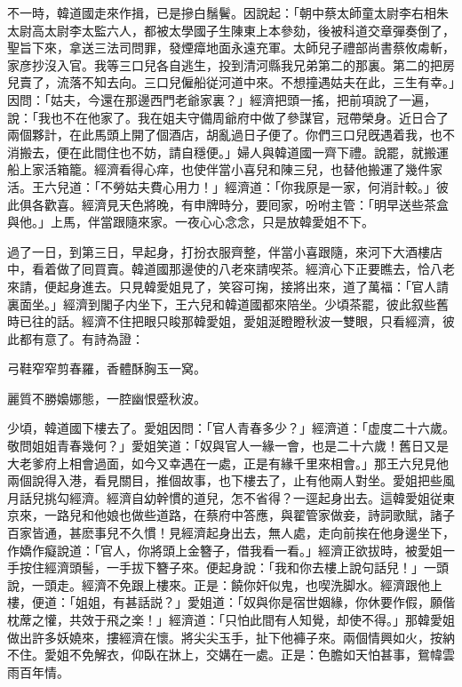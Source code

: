 不一時，韓道國走來作揖，已是摻白鬚鬢。因說起：「朝中蔡太師童太尉李右相朱太尉高太尉李太監六人，都被太學國子生陳東上本參劾，後被科道交章彈奏倒了，聖旨下來，拿送三法司問罪，發煙瘴地面永遠充軍。太師兒子禮部尚書蔡攸䖏斬，家彦抄沒入官。我等三口兒各自逃生，投到清河縣我兄弟第二的那裏。第二的把房兒賣了，流落不知去向。三口兒僱船従河道中來。不想撞遇姑夫在此，三生有幸。」因問：「姑夫，今還在那邊西門老爺家裏？」經濟把頭一搖，把前項說了一遍，說：「我也不在他家了。我在姐夫守備周爺府中做了參謀官，冠帶榮身。近日合了兩個夥計，在此馬頭上開了個酒店，胡亂過日子便了。你們三口兒旣遇着我，也不消搬去，便在此間住也不妨，請自穩便。」婦人與韓道國一齊下禮。說罷，就搬運船上家活箱籠。經濟看得心痒，也使伴當小喜兒和陳三兒，也替他搬運了幾件家活。王六兒道：「不勞姑夫費心用力！」經濟道：「你我原是一家，何消計較。」彼此俱各歡喜。經濟見天色將晚，有申牌時分，要囘家，吩咐主管：「明早送些茶盒與他。」上馬，伴當跟隨來家。一夜心心念念，只是放韓愛姐不下。

過了一日，到第三日，早起身，打扮衣服齊整，伴當小喜跟隨，來河下大酒樓店中，看着做了囘買賣。韓道國那邊使的八老來請喫茶。經濟心下正要瞧去，恰八老來請，便起身進去。只見韓愛姐見了，笑容可掬，接將出來，道了萬福：「官人請裏面坐。」經濟到閣子内坐下，王六兒和韓道國都來陪坐。少頃茶罷，彼此叙些舊時已往的話。經濟不住把眼只睃那韓愛姐，愛姐涎瞪瞪秋波一雙眼，只看經濟，彼此都有意了。有詩為證：

弓鞋窄窄剪春羅，香體酥胸玉一窝。

麗質不勝嬝娜態，一腔幽恨蹙秋波。

少頃，韓道國下樓去了。愛姐因問：「官人青春多少？」經濟道：「虚度二十六歲。敬問姐姐青春幾何？」愛姐笑道：「奴與官人一緣一會，也是二十六歲！舊日又是大老爹府上相會過面，如今又幸遇在一處，正是有緣千里來相會。」那王六兒見他兩個說得入港，看見關目，推個故事，也下樓去了，止有他兩人對坐。愛姐把些風月話兒挑勾經濟。經濟自幼幹慣的道兒，怎不省得？一逕起身出去。這韓愛姐従東京來，一路兒和他娘也做些道路，在蔡府中答應，與翟管家做妾，詩詞歌賦，諸子百家皆通，甚麽事兒不久慣！見經濟起身出去，無人處，走向前挨在他身邊坐下，作嬌作癡說道：「官人，你將頭上金簪子，借我看一看。」經濟正欲拔時，被愛姐一手按住經濟頭髻，一手拔下簪子來。便起身說：「我和你去樓上說句話兒！」一頭說，一頭走。經濟不免跟上樓來。正是：饒你奸似鬼，也喫洗脚水。經濟跟他上樓，便道：「姐姐，有甚話説？」愛姐道：「奴與你是宿世姻緣，你休要作假，願偕枕蓆之懽，共效于飛之楽！」經濟道：「只怕此間有人知覺，却使不得。」那韓愛姐做出許多妖嬈來，摟經濟在懷。將尖尖玉手，扯下他褲子來。兩個情興如火，按納不住。愛姐不免解衣，仰臥在牀上，交媾在一處。正是：色膽如天怕甚事，鴛幃雲雨百年情。

